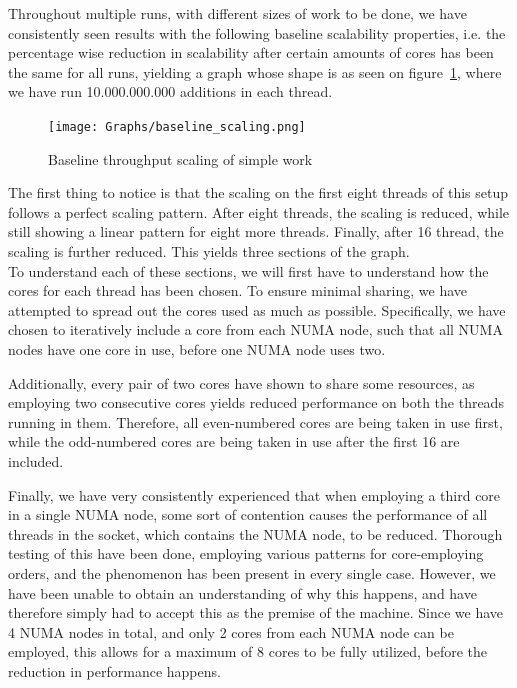 \documentclass[11pt]{article} %
\begin{document}
Throughout multiple runs, with different sizes of work to be done, we have consistently seen results with the following baseline scalability properties, i.e. the percentage wise reduction in scalability after certain amounts of cores has been the same for all runs, yielding a graph whose shape is as seen on figure~\ref{fig:baseline_scaling}, where we have run 10.000.000.000 additions in each thread.  

\begin{figure}[H]
  \centering
  \texttt{[image: Graphs/baseline\_scaling.png]}
  \caption{Baseline throughput scaling of simple work}
  \label{fig:baseline_scaling}
\end{figure}
The first thing to notice is that the scaling on the first eight threads of this setup follows a perfect scaling pattern. After eight threads, the scaling is reduced, while still showing a linear pattern for eight more threads. Finally, after 16 thread, the scaling is further reduced. This yields three sections of the graph. \\

To understand each of these sections, we will first have to understand how the cores for each thread has been chosen. To ensure minimal sharing, we have attempted to spread out the cores used as much as possible. Specifically, we have chosen to iteratively include a core from each NUMA node, such that all NUMA nodes have one core in use, before one NUMA node uses two. 

Additionally, every pair of two cores have shown to share some resources, as employing two consecutive cores yields reduced performance on both the threads running in them. Therefore, all even-numbered cores are being taken in use first, while the odd-numbered cores are being taken in use after the first 16 are included.

Finally, we have very consistently experienced that when employing a third core in a single NUMA node, some sort of contention causes the performance of all threads in the socket, which contains the NUMA node, to be reduced. Thorough testing of this have been done, employing various patterns for core-employing orders, and the phenomenon has been present in every single case. However, we have been unable to obtain an understanding of why this happens, and have therefore simply had to accept this as the premise of the machine. Since we have 4 NUMA nodes in total, and only 2 cores from each NUMA node can be employed, this allows for a maximum of 8 cores to be fully utilized, before the reduction in performance happens.\\
\end{document}
